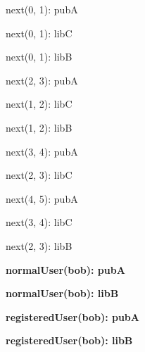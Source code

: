 \documentclass{article}
\newenvironment{states}
        {\begin{minipage}{\tableWidth}\raggedright\begin{description}[align=left,leftmargin=1em,noitemsep,labelsep=\parindent]}
        {\end{description}\end{minipage}}
\begin{document}
{\begin{states}
\item{{next(\allowbreak{}0, 1): pubA}}
\item{{next(\allowbreak{}0, 1): libC}}
\item{{next(\allowbreak{}0, 1): libB}}
\item{{next(\allowbreak{}2, 3): pubA}}
\item{{next(\allowbreak{}1, 2): libC}}
\item{{next(\allowbreak{}1, 2): libB}}
\item{{next(\allowbreak{}3, 4): pubA}}
\item{{next(\allowbreak{}2, 3): libC}}
\item{{next(\allowbreak{}4, 5): pubA}}
\item{{next(\allowbreak{}3, 4): libC}}
\item{{next(\allowbreak{}2, 3): libB}}
\item\textbf{{normalUser(\allowbreak{}bob): pubA}}
\item\textbf{{normalUser(\allowbreak{}bob): libB}}
\item\textbf{{registeredUser(\allowbreak{}bob): pubA}}
\item\textbf{{registeredUser(\allowbreak{}bob): libB}}
\end{states}}
\end{document}
